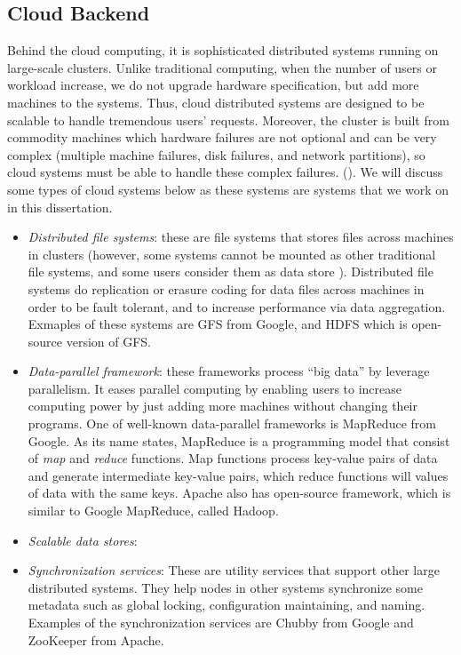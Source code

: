 \subsection{Cloud Backend}

Behind the cloud computing, it is sophisticated distributed systems running on
large-scale clusters. Unlike traditional computing, when the number of users or
workload increase, we do not upgrade hardware specification, but add more
machines to the systems. Thus, cloud distributed systems are designed to be
scalable to handle tremendous users' requests. Moreover, the cluster is built
from commodity machines which hardware failures are not optional and can be very
complex (\eg multiple machine failures, disk failures, and network partitions),
so cloud systems must be able to handle these complex failures. (). We will discuss some types of cloud systems below as these systems are
systems that we work on in this dissertation.

\begin{itemize}

\item \textit{Distributed file systems}: these are file systems that stores
files across machines in clusters (however, some systems cannot be mounted as
other traditional file systems, and some users consider them as data store
\cite{HadoopStorage}). Distributed file systems do replication or erasure coding
for data files across machines in order to be fault tolerant, and to increase
performance via data aggregation. Exmaples of these systems are GFS from Google,
and HDFS which is open-source version of GFS.

\item \textit{Data-parallel framework}: these frameworks process ``big data'' by
leverage parallelism. It eases parallel computing by enabling users to increase
computing power by just adding more machines without changing their programs.
One of well-known data-parallel frameworks is MapReduce from Google. As its name
states, MapReduce is a programming model that consist of \textit{map} and
\textit{reduce} functions. Map functions process key-value pairs of data and
generate intermediate key-value pairs, which reduce functions will values of
data with the same keys. Apache also has open-source framework, which is similar
to Google MapReduce, called Hadoop.

\item \textit{Scalable data stores}:

\item \textit{Synchronization services}: These are utility services that support
other large distributed systems. They help nodes in other systems synchronize
some metadata such as global locking, configuration maintaining, and naming.
Examples of the synchronization services are Chubby from Google and ZooKeeper
from Apache.

\end{itemize}
